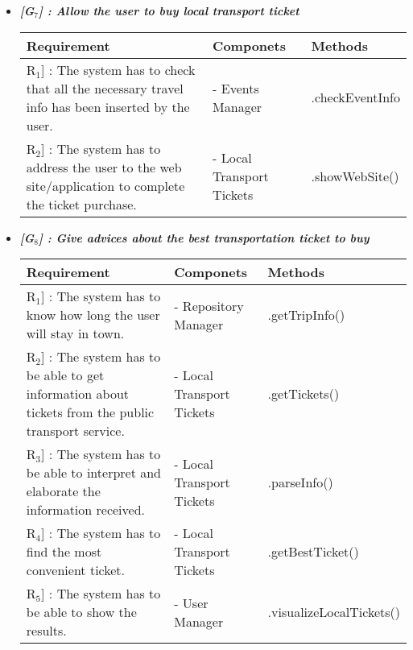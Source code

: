 \begin{itemize}
	\item \emph{\textbf{[G$_{7}$] : Allow the user to buy local transport ticket}}
	\vspace{0.4cm}\\
	\begin{tabular}[H]{p{5cm}|p{4cm}|p{4cm}}
		\textbf{Requirement} & \textbf{Componets} & \textbf{Methods}\\
		\hline
		\rule{0pt}{4ex}\lbrack R$_{1}$] : The system has to check that all the necessary travel info has been inserted by the user. & - Events Manager & .checkEventInfo\\
		\hline
		\rule{0pt}{4ex}\lbrack R$_{2}$] : The system has to address the user to the web site/application to complete the ticket purchase. & - Local Transport Tickets & .showWebSite()
	\end{tabular}
	
	\newpage
	\item \emph{\textbf{[G$_{8}$] : Give advices about the best transportation ticket to buy}}
	\vspace{0.4cm}\\
	\begin{tabular}[H]{p{5cm}|p{4cm}|p{4cm}}
		\textbf{Requirement} & \textbf{Componets} & \textbf{Methods}\\
		\hline
		\rule{0pt}{4ex}\lbrack R$_{1}$] : The system has to know how long the user will stay in town. & - Repository Manager & .getTripInfo()\\
		\hline
		\rule{0pt}{4ex}\lbrack R$_{2}$] : The system has to be able to get information about tickets from the public transport service. & - Local Transport Tickets & .getTickets()\\
		\hline
		\rule{0pt}{4ex}\lbrack R$_{3}$] : The system has to be able to interpret and elaborate the information received. & - Local Transport Tickets & .parseInfo()\\
		\hline
		\rule{0pt}{4ex}\lbrack R$_{4}$] : The system has to find the most convenient ticket. & - Local Transport Tickets & .getBestTicket()\\
		\hline
		\rule{0pt}{4ex}\lbrack R$_{5}$] : The system has to be able to show the results. & - User Manager & .visualizeLocalTickets()
	\end{tabular}
	\vspace{0.3cm}\\
	

\end{itemize}
